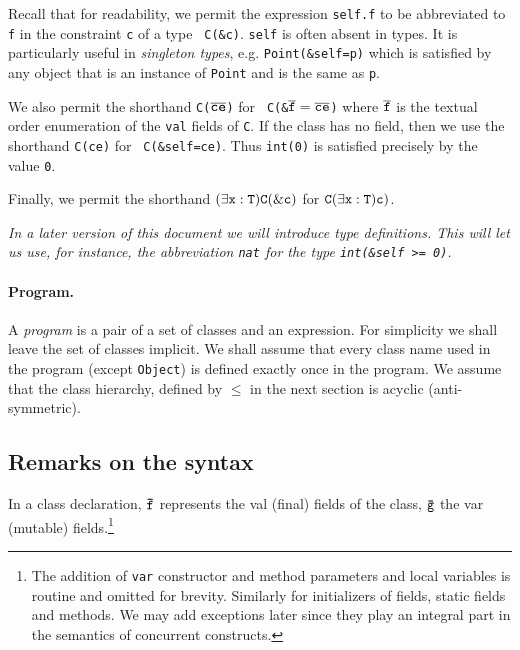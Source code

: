 \documentclass{article}
\begin{document}
Recall that for readability, we permit the expression {\tt self.f} to
be abbreviated to {\tt f} in the constraint {\tt c} of a type {\tt
C(\&c)}.  {\tt self} is often absent in types. It is particularly
useful in {\em singleton types}, e.g. {\tt Point(\&self=p)} which is
satisfied by any object that is an instance of {\tt Point} and is the
same as {\tt p}.

We also permit the shorthand {\tt C($\overline{\tt ce}$)} for {\tt
C(\&$\overline{\tt f}=\overline{\tt ce}$)} where $\tt \overline f$ is the textual
order enumeration of the {\tt val} fields of {\tt C}. If the class has
no field, then we use the shorthand {\tt C(ce)} for {\tt
C(\&self=ce)}. Thus {\tt int(0)} is satisfied precisely by the value
{\tt 0}.

Finally, we permit the shorthand $\tt (\exists x:T) C(\&c)$ for
$\tt C(\exists x:T)c)$.

{\em In a later version of this document we will introduce type definitions.
This will let us use, for instance, the abbreviation {\tt nat}
for the type {\tt int(\&self >= 0)}. 
}

\paragraph{Program.}
A {\em program} is a pair of a set of classes and an expression. For
simplicity we shall leave the set of classes implicit. We shall assume
that every class name used in the program (except {\tt Object}) is
defined exactly once in the program. We assume that the class
hierarchy, defined by $\leq$ in the next section is acyclic
(anti-symmetric).

\subsection{Remarks on the syntax}
In a class declaration, $\tt\bar{\tt f}$ represents the val (final)
fields of the class, $\tt\bar{\tt g}$ the var (mutable)
fields.\footnote{ The addition of {\tt var} constructor and method
parameters and local variables is routine and omitted for
brevity. Similarly for initializers of fields, static fields and
methods. We may add exceptions later since they play an integral part in the
semantics of concurrent constructs.} 

\end{document}
